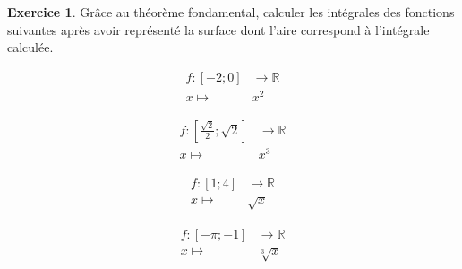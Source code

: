 \documentclass[a4paper,fontsize=13pt]{scrreprt}
\theoremstyle{plain}
\theoremstyle{definition}
\newtheorem{exo}[subsection]{Exercice}
\newcommand{\rr}{\mathbb{R}}
\begin{document}
\begin{exo}
Grâce au théorème fondamental, calculer les intégrales des fonctions suivantes après avoir représenté la surface dont l'aire correspond à l'intégrale calculée.
\begin{enumerate}
\begin{multicols}{2}
\item \begin{align*}
f : [-2;0] &\to \rr \\
x \mapsto& x^2
\end{align*}
\item \begin{align*}
f : [\frac{\sqrt{2}}{2};\sqrt{2}] &\to \rr \\
x \mapsto& x^3
\end{align*}
\item \begin{align*}
f : [1;4] &\to \rr \\
x \mapsto& \sqrt{x}
\end{align*}
\item \begin{align*}
f : [-\pi;-1] &\to \rr \\
x \mapsto& \sqrt[3]{x}
\end{align*}
\end{multicols}
\end{enumerate}
\end{exo}
\newpage
\end{document}
